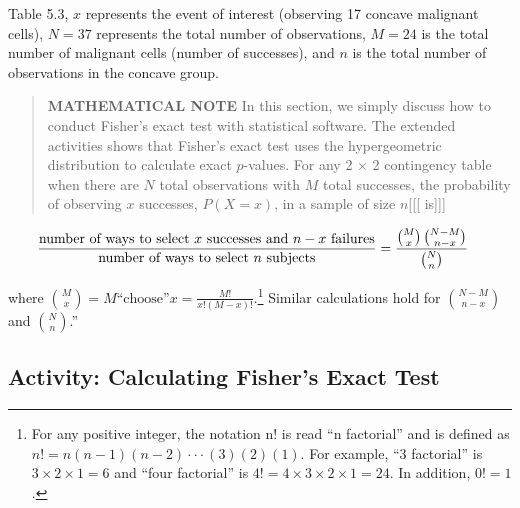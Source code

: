 \documentclass[
]{book}
\begin{document}
Table 5.3, \(x\) represents the event of interest (observing 17 concave malignant cells), \(N = 37\) represents the total number of observations, \(M = 24\) is the total number of malignant cells (number of successes), and \(n\) is the total number of observations in the concave group.

\begin{quote}
\textbf{MATHEMATICAL NOTE} In this section, we simply discuss how to conduct Fisher's exact test with statistical software. The extended activities shows that Fisher's exact test uses the hypergeometric distribution to calculate exact \(p\)-values. For any 2 × 2 contingency table when there are \(N\) total observations with \(M\) total successes, the probability of observing \(x\) successes, \(P(X = x)\), in a sample of size \(n\){[}{[}{[} is{]}{]}{]}
\end{quote}

\begin{align}
\frac{\text{number of ways to select $x$ successes and $n - x$ failures}}{\text{number of ways to select $n$ subjects}}
 &= \frac{\binom{M}{x}\,\binom{N - M}{n - x}}{\binom{N}{n}} \notag
\end{align}

where \(\binom{M}{x} = M \text{“choose”} x = \frac{M!}{x!(M - x)!}\).\footnote{For any positive integer, the notation n! is read ``n factorial'' and is defined as \(n!= n(n- 1)(n- 2) \cdot\cdot\cdot (3)(2)(1)\). For example, ``3 factorial'' is \(3 \times 2 \times 1= 6\) and ``four factorial'' is \(4!= 4 \times 3 \times 2 \times 1= 24\). In addition, \(0!= 1\).} Similar calculations hold for \(\binom{N - M}{n - x}\) and \(\binom{N}{n}\).''

\hypertarget{activity-calculating-fishers-exact-test}{%
\subsection*{Activity: Calculating Fisher's Exact Test}\label{activity-calculating-fishers-exact-test}}
\end{document}
